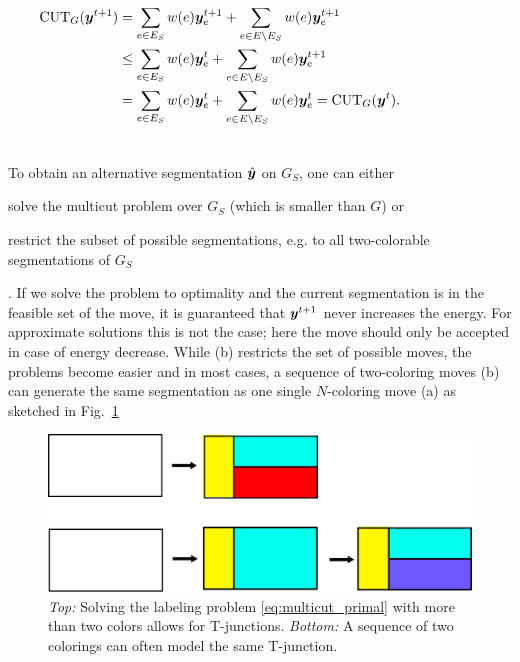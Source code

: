 \begin{align*}
\CUT_G(\y^{t+1})
&=
\sum_{e\in E_S}            \w(e) \y_e^{t+1} +
\sum_{e\in E\setminus E_S} \w(e) \y_e^{t+1}
\\
&\leq
%
\sum_{e\in E_S}            \w(e) \y_e^t +
\sum_{e\in E\setminus E_S} \w(e) \y_e^{t+1}\\
%
&=
%
\sum_{e\in E_S}            \w(e) \y_e^t +
\sum_{e\in E\setminus E_S} \w(e) \y_e^t 
%
=
%
\CUT_G(\y^t).\\
&\hspace*{0.75\columnwidth}
\end{align*}



To obtain an alternative segmentation $\hat{\boldsymbol y}$ on $G_S$, one can either
\begin{inparaenum}[(a)]
\item solve the multicut problem over $G_S$ (which is smaller than $G$)
or
\item restrict the subset of possible segmentations,
      e.g. to all two-colorable segmentations of $G_S$%
\end{inparaenum}.
If we solve the problem to optimality and the current segmentation is in
the feasible set of the move,
it is guaranteed that $\boldsymbol y^{t+1}$ never increases the
energy.
%
For approximate solutions this is not the case; here the move should only be
accepted in case of energy decrease.
%
While (b) restricts the set of possible moves, the problems become easier
and in most cases, a sequence of two-coloring moves (b)
can generate the same segmentation as one single $N$-coloring move (a)
as sketched in Fig.~\ref{fig:illustrate_t}

\begin{figure}[b]
\centering\includegraphics[width=0.8\columnwidth]{fig/tjunction.pdf}
\caption{%
\emph{Top:} Solving the labeling problem \eqref{eq:multicut_primal} with
more than two colors allows for T-junctions.
%
\emph{Bottom:} A sequence of two colorings can often model the same
T-junction. 
\label{fig:illustrate_t}}
\end{figure}





